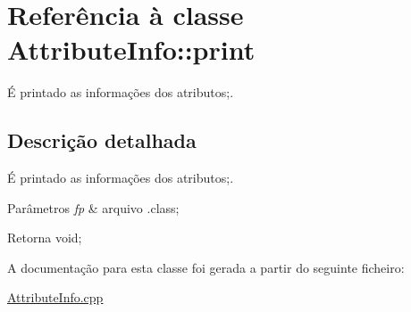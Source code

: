 \hypertarget{class_attribute_info_1_1print}{}\section{Referência à classe Attribute\+Info\+:\+:print}
\label{class_attribute_info_1_1print}


É printado as informações dos atributos;.  




\subsection{Descrição detalhada}
É printado as informações dos atributos;. 


\begin{DoxyParams}{Parâmetros}
{\em fp} & arquivo .class; \\
\hline
\end{DoxyParams}
\begin{DoxyReturn}{Retorna}
void; 
\end{DoxyReturn}


A documentação para esta classe foi gerada a partir do seguinte ficheiro\+:\begin{DoxyCompactItemize}
\item 
\hyperlink{_attribute_info_8cpp}{Attribute\+Info.\+cpp}\end{DoxyCompactItemize}
